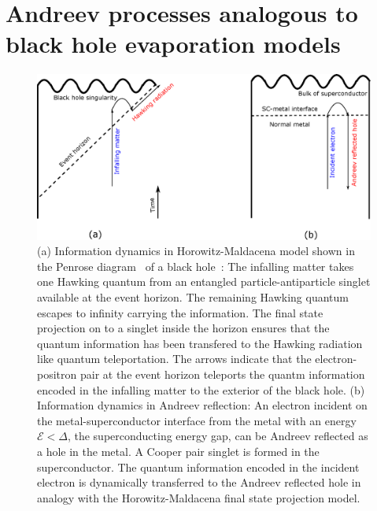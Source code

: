 \documentclass[12pt,letterpaper,aps,onecolumn,superscriptaddress,floatfix,notitlepage]{revtex4-1}
\begin{document}
	\section{Andreev processes analogous to black hole evaporation models\label{sec3}} 
	\begin{figure}
		\includegraphics[scale=0.4]{fig3.eps}
		\caption{(a) Information dynamics in Horowitz-Maldacena model shown in the Penrose diagram~\cite{penrose2011republication} of a black hole~\cite{projection,horowitz}: The infalling matter takes one Hawking quantum from an entangled particle-antiparticle singlet available at the event horizon. The remaining Hawking quantum escapes to infinity carrying the information. The final state projection on to a singlet inside the horizon ensures that the quantum information has been transfered to the Hawking radiation like quantum teleportation. The arrows indicate that the electron-positron pair at the event horizon teleports the quantm information  encoded in the infalling matter to the exterior of the black hole. (b) Information dynamics in Andreev reflection: An electron incident on the metal-superconductor interface from the metal with an energy $\mathcal{E} <\Delta$, the superconducting energy gap, can be Andreev reflected as a hole in the metal. A Cooper pair singlet is formed in the superconductor. The quantum information encoded in the incident electron is dynamically transferred to the Andreev reflected hole in analogy with the Horowitz-Maldacena final state projection model.\label{andreev}}
	\end{figure} 
	
\end{document}
